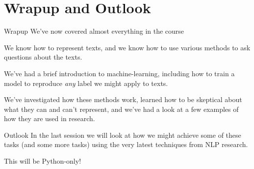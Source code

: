 \documentclass[
  10pt,
  ignorenonframetext,
  aspectratio=169]{beamer}
\newif\ifbibliography
\begin{document}
\hypertarget{wrapup-and-outlook}{%
\section{Wrapup and Outlook}\label{wrapup-and-outlook}}

\begin{frame}{Wrapup}
\protect\hypertarget{wrapup}{}
We've now covered almost everything in the course

We know how to represent texts, and we know how to use various methods
to ask questions about the texts.

We've had a brief introduction to machine-learning, including how to
train a model to reproduce \emph{any} label we might apply to texts.

We've investigated how these methods work, learned how to be skeptical
about what they can and can't represent, and we've had a look at a few
examples of how they are used in research.
\end{frame}

\begin{frame}{Outlook}
\protect\hypertarget{outlook}{}
In the last session we will look at how we might achieve some of these
tasks (and some more tasks) using the very latest techniques from NLP
research.

This will be Python-only!
\end{frame}

\begin{frame}[allowframebreaks]{}
  \bibliographytrue
  
\end{frame}
\end{document}
